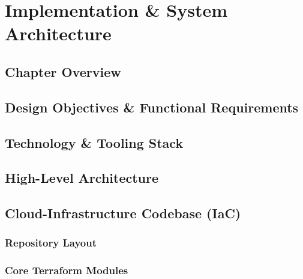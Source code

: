 \chapter{Implementation & System Architecture}

\section{Chapter Overview}

\section{Design Objectives & Functional Requirements}

\section{Technology & Tooling Stack}

\section{High-Level Architecture}

\section{Cloud-Infrastructure Codebase (IaC)}

\subsection{Repository Layout}

\subsection{Core Terraform Modules}

